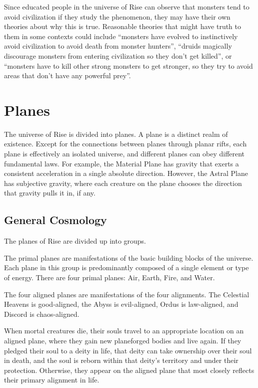       Since educated people in the universe of Rise can observe that monsters tend to avoid civilization if they study the phenomenon, they may have their own theories about why this is true.
      Reasonable theories that might have truth to them in some contexts could include ``monsters have evolved to instinctively avoid civilization to avoid death from monster hunters'', ``druids magically discourage monsters from entering civilization so they don't get killed'', or ``monsters have to kill other strong monsters to get stronger, so they try to avoid areas that don't have any powerful prey''.

\section{Planes}\label{Planes}
  The universe of Rise is divided into planes.
  A plane is a distinct realm of existence.
  Except for the connections between planes through planar rifts, each plane is effectively an isolated universe, and different planes can obey different fundamental laws.
  For example, the Material Plane has gravity that exerts a consistent acceleration in a single absolute direction.
  However, the Astral Plane has subjective gravity, where each creature on the plane chooses the direction that gravity pulls it in, if any.

  \subsection{General Cosmology}
    The planes of Rise are divided up into groups.

     The primal planes are manifestations of the basic building blocks of the universe.
    Each plane in this group is predominantly composed of a single element or type of energy.
    There are four primal planes: Air, Earth, Fire, and Water.

     The four aligned planes are manifestations of the four alignments.
    The Celestial Heavens is good-aligned, the Abyss is evil-aligned, Ordus is law-aligned, and Discord is chaos-aligned.

    When mortal creatures die, their souls travel to an appropriate location on an aligned plane, where they gain new planeforged bodies and live again.
    If they pledged their soul to a deity in life, that deity can take ownership over their soul in death, and the soul is reborn within that deity's territory and under their protection.
    Otherwise, they appear on the aligned plane that most closely reflects their primary alignment in life.

